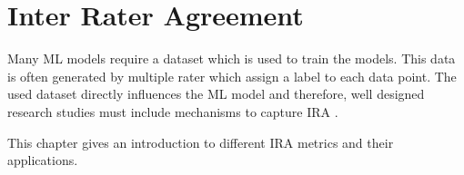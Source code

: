 \section{Inter Rater Agreement}
\label{chp:fundamentals:sec:inter_rater_agreement}
Many \ac{ML} models require a dataset which is used to train the models.
This data is often generated by multiple rater which assign a label to each data point.
The used dataset directly influences the \ac{ML} model \parencite{Gray:2011} and therefore, well designed research studies must include mechanisms to capture \ac{IRA} \parencite{McHugh:2012}.

This chapter gives an introduction to different \ac{IRA} metrics and their applications.




